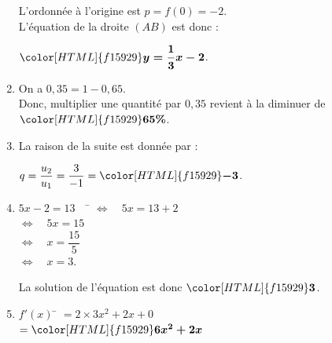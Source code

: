 \documentclass[a4paper,11pt,landscape,exos]{nsi} %
\begin{document}
\begin{multicols}{2}
\begin{enumerate}[itemsep=.75em]
\medskip
L'ordonnée à l'origine est $p=f(0)=-2$.\\
L'équation de la droite $(AB)$ est donc :
\begin{center}
    $\color[HTML]{f15929}\boldsymbol{y=\dfrac{1}{3}x-2}$.
\end{center}
\item On a $0{,}35=1-0{,}65$.\\
    Donc, multiplier une quantité par $0{,}35$ revient à la diminuer de $\color[HTML]{f15929}\boldsymbol{65\%}$.
\item La raison de la suite est donnée par :
\begin{center}
    $q=\dfrac{u_2}{u_1}=\dfrac{3}{-1}=\color[HTML]{f15929}\boldsymbol{-3}$.
\end{center}
\item \begin{tabbing}
    $5x-2=13\quad$ \= $\iff \quad 5x=13+2$ \\
    \> $\iff \quad 5x=15$\\
    \> $\iff \quad x=\dfrac{15}{5}$\\
    \> $\iff \quad x=3$.
\end{tabbing}
La solution de l'équation est donc $\color[HTML]{f15929}\boldsymbol{3}$.
\item \begin{tabbing}
    $f'(x)$ \= $=2\times 3x^2+2x+0$\\
    \> $=\color[HTML]{f15929}\boldsymbol{6x^2+2x}$
\end{tabbing}
\end{enumerate}
\vfill
\end{multicols}
\end{document}
